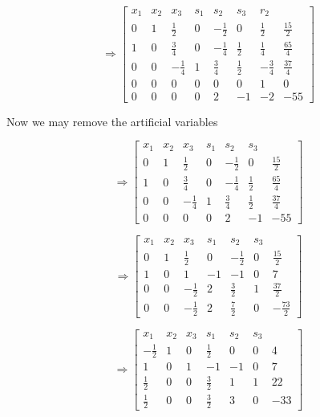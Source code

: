\documentclass[12pt]{article}
\begin{document}
\[
\Rightarrow
\left[ \begin{array} {lll|lll|l|l}
x_1 & x_2 & x_3 &s_1 & s_2 &s_3 &r_2&\\
\hline
 0 & 1 & \frac{1}{2} & 0 & -\frac{1}{2} & 0 & \frac{1}{2} & \frac{15}{2} \\
 1 & 0 & \frac{3}{4} & 0 & -\frac{1}{4} & \frac{1}{2} & \frac{1}{4} & \frac{65}{4} \\
 0 & 0 & -\frac{1}{4} & 1 & \frac{3}{4} & \frac{1}{2} & -\frac{3}{4} & \frac{37}{4} \\
 \hline
 0 & 0 & 0 & 0 & 0 & 0 & 1 & 0 \\
 0 & 0 & 0 & 0 & 2 & -1 & -2 & -55
\end{array}\right]
\]

Now we may remove the artificial variables 

\[
\Rightarrow
\left[ \begin{array} {lll|lll|l}
x_1 & x_2 & x_3 &s_1 & s_2 &s_3 &\\
\hline
 0 & 1 & \frac{1}{2} & 0 & -\frac{1}{2} & 0 & \frac{15}{2} \\
 1 & 0 & \frac{3}{4} & 0 & -\frac{1}{4} & \frac{1}{2} & \frac{65}{4} \\
 0 & 0 & -\frac{1}{4} & 1 & \frac{3}{4} & \frac{1}{2} & \frac{37}{4} \\
 \hline
 0 & 0 & 0 & 0 & 2 & -1  & -55
\end{array}\right]
\]

\[
\Rightarrow
\left[ \begin{array} {lll|lll|l}
x_1 & x_2 & x_3 &s_1 & s_2 &s_3 &\\
\hline
 0 & 1 & \frac{1}{2} & 0 & -\frac{1}{2} & 0 & \frac{15}{2} \\
 1 & 0 & 1 & -1 & -1 & 0 & 7 \\
 0 & 0 & -\frac{1}{2} & 2 & \frac{3}{2} & 1 & \frac{37}{2} \\
 \hline
 0 & 0 & -\frac{1}{2} & 2 & \frac{7}{2} & 0 & -\frac{73}{2}
\end{array}\right]
\]

\[
\Rightarrow
\left[ \begin{array} {lll|lll|l}
x_1 & x_2 & x_3 &s_1 & s_2 &s_3 &\\
\hline
 -\frac{1}{2} & 1 & 0 & \frac{1}{2} & 0 & 0 & 4 \\
 1 & 0 & 1 & -1 & -1 & 0 & 7 \\
 \frac{1}{2} & 0 & 0 & \frac{3}{2} & 1 & 1 & 22 \\
 \hline
 \frac{1}{2} & 0 & 0 & \frac{3}{2} & 3 & 0 & -33
\end{array}\right]
\]
\end{document}
